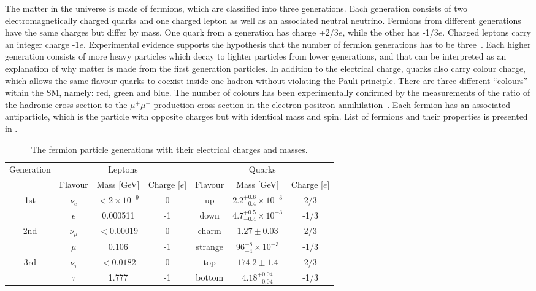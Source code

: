 The matter in the universe is made of fermions, which are classified into three generations.
Each generation consists of two electromagnetically charged quarks and one charged lepton as well as an associated neutral neutrino.
Fermions from different generations have the same charges but differ by mass.
One quark from a generation has charge +2/3$e$, while the other has -1/3$e$. Charged leptons carry an integer charge -1$e$.
Experimental evidence supports the hypothesis that the number of fermion generations has to be three~\cite{three_lepton_generations}.
Each higher generation consists of more heavy particles which decay to lighter particles from lower generations, and that can be
interpreted as an explanation of why matter is made from the first generation particles.
In addition to the electrical charge, quarks also carry colour charge, which allows the same flavour quarks to coexist inside one hadron without violating the Pauli principle.
There are three different ``colours'' within the SM, namely: red, green and blue.
The number of colours has been experimentally confirmed by the measurements of the ratio of the hadronic cross section 
to the $\mu^+\mu^-$ production cross section in the electron-positron annihilation~\cite{pdg_2014}. 
Each fermion has an associated antiparticle, which is the particle with opposite charges but with identical mass and spin.
List of fermions and their properties is presented in .

\begin{table*}[!ht]
\begin{center}
\begin{tabular}{c||c|c|c||c|c|c}
\multirow{2}{*}{Generation} & \multicolumn{3}{c||}{Leptons} & \multicolumn{3}{c}{Quarks} \\
\cline{2-7}
 & Flavour & Mass [GeV] & Charge [$e$] &  Flavour & Mass [GeV] & Charge [$e$] \\
\hline
\multirow{2}{*}{1st} & $\nu_e$ & $<2\times10^{-9}$ & 0 & up & $2.2^{+0.6}_{-0.4}\times10^{-3}$ & 2/3 \\
 & $e$ & 0.000511 & -1 & down & $4.7^{+0.5}_{-0.4}\times10^{-3}$ & -1/3 \\
\cline{1-7} 
\multirow{2}{*}{2nd} & $\nu_{\mu}$ & $<0.00019$ & 0 & charm & $1.27\pm0.03$ & 2/3 \\
 & $\mu$ & 0.106 & -1 & strange & $96^{+8}_{-4}\times10^{-3}$ & -1/3 \\
\cline{1-7}
\multirow{2}{*}{3rd} & $\nu_{\tau}$ & $<0.0182$ & 0 & top & $174.2\pm1.4$ & 2/3 \\
 & $\tau$ & 1.777 & -1 & bottom & $4.18^{+0.04}_{-0.04}$ & -1/3 \\
\end{tabular}
\end{center}
 \caption{The fermion particle generations with their electrical charges and masses.}
\label{tab:fermions}
\end{table*}

